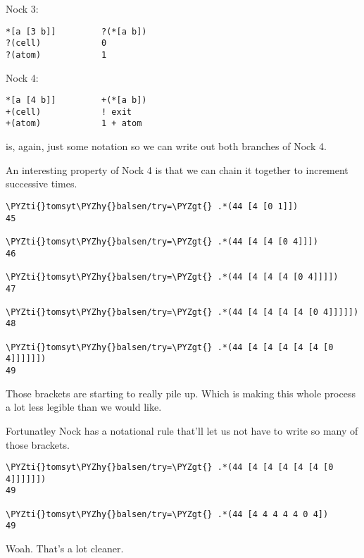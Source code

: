 Nock 3:
\begin{framed_shaded}
\begin{Verbatim}[fontsize=\relsize{-2.5},commandchars=\\\{\}]
*[a [3 b]]         ?(*[a b])
?(cell)            0
?(atom)            1
\end{Verbatim}
\end{framed_shaded}
Nock 4:
\begin{framed_shaded}
\begin{Verbatim}[fontsize=\relsize{-2.5},commandchars=\\\{\}]
*[a [4 b]]         +(*[a b])
+(cell)            ! exit
+(atom)            1 + atom
\end{Verbatim}
\end{framed_shaded}
 is, again, just some notation so we can write out both branches of Nock
4.

An interesting property of Nock 4 is that  we can chain it together to
increment successive times.
\begin{framed_shaded}
\begin{Verbatim}[fontsize=\relsize{-2.5},commandchars=\\\{\}]
\PYZti{}tomsyt\PYZhy{}balsen/try=\PYZgt{} .*(44 [4 [0 1]])
45

\PYZti{}tomsyt\PYZhy{}balsen/try=\PYZgt{} .*(44 [4 [4 [0 4]]])
46

\PYZti{}tomsyt\PYZhy{}balsen/try=\PYZgt{} .*(44 [4 [4 [4 [0 4]]]])
47

\PYZti{}tomsyt\PYZhy{}balsen/try=\PYZgt{} .*(44 [4 [4 [4 [4 [0 4]]]]])
48

\PYZti{}tomsyt\PYZhy{}balsen/try=\PYZgt{} .*(44 [4 [4 [4 [4 [4 [0 4]]]]]])
49
\end{Verbatim}
\end{framed_shaded}
Those brackets are starting to really pile up. Which is making this whole
process a lot less legible than we would like.

Fortunatley Nock has a notational rule that'll let us not have to write so many
of those brackets.
\begin{framed_shaded}
\begin{Verbatim}[fontsize=\relsize{-2.5},commandchars=\\\{\}]
\PYZti{}tomsyt\PYZhy{}balsen/try=\PYZgt{} .*(44 [4 [4 [4 [4 [4 [0 4]]]]]])
49

\PYZti{}tomsyt\PYZhy{}balsen/try=\PYZgt{} .*(44 [4 4 4 4 4 0 4])
49
\end{Verbatim}
\end{framed_shaded}
Woah. That's a lot cleaner.

